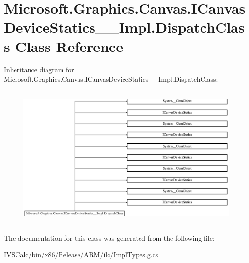 \hypertarget{class_microsoft_1_1_graphics_1_1_canvas_1_1_i_canvas_device_statics_____impl_1_1_dispatch_class}{}\section{Microsoft.\+Graphics.\+Canvas.\+I\+Canvas\+Device\+Statics\+\_\+\+\_\+\+Impl.\+Dispatch\+Class Class Reference}
\label{class_microsoft_1_1_graphics_1_1_canvas_1_1_i_canvas_device_statics_____impl_1_1_dispatch_class}
Inheritance diagram for Microsoft.\+Graphics.\+Canvas.\+I\+Canvas\+Device\+Statics\+\_\+\+\_\+\+Impl.\+Dispatch\+Class\+:\begin{figure}[H]
\begin{center}
\leavevmode
\includegraphics[height=7.298578cm]{class_microsoft_1_1_graphics_1_1_canvas_1_1_i_canvas_device_statics_____impl_1_1_dispatch_class}
\end{center}
\end{figure}


The documentation for this class was generated from the following file\+:\begin{DoxyCompactItemize}
\item 
I\+V\+S\+Calc/bin/x86/\+Release/\+A\+R\+M/ilc/Impl\+Types.\+g.\+cs\end{DoxyCompactItemize}
